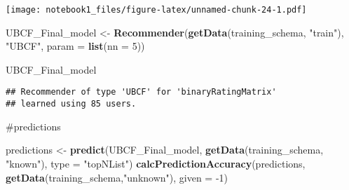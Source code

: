 \documentclass[
]{article}
\newenvironment{Shaded}{\begin{snugshade}}{\end{snugshade}}
\newcommand{\CommentTok}[1]{\textcolor[rgb]{0.56,0.35,0.01}{\textit{#1}}}
\newcommand{\DataTypeTok}[1]{\textcolor[rgb]{0.13,0.29,0.53}{#1}}
\newcommand{\DecValTok}[1]{\textcolor[rgb]{0.00,0.00,0.81}{#1}}
\newcommand{\KeywordTok}[1]{\textcolor[rgb]{0.13,0.29,0.53}{\textbf{#1}}}
\newcommand{\NormalTok}[1]{#1}
\newcommand{\OperatorTok}[1]{\textcolor[rgb]{0.81,0.36,0.00}{\textbf{#1}}}
\newcommand{\StringTok}[1]{\textcolor[rgb]{0.31,0.60,0.02}{#1}}
\begin{document}
\begin{Shaded}
\end{Shaded}

\texttt{[image: notebook1\_files/figure-latex/unnamed-chunk-24-1.pdf]}

\begin{Shaded}
\begin{Highlighting}[]
\NormalTok{UBCF_Final_model <-}\StringTok{ }\KeywordTok{Recommender}\NormalTok{(}\KeywordTok{getData}\NormalTok{(training_schema, }\StringTok{"train"}\NormalTok{), }\StringTok{"UBCF"}\NormalTok{, }\DataTypeTok{param =} \KeywordTok{list}\NormalTok{(}\DataTypeTok{nn =} \DecValTok{5}\NormalTok{))}


\NormalTok{UBCF_Final_model}
\end{Highlighting}
\end{Shaded}

\begin{verbatim}
## Recommender of type 'UBCF' for 'binaryRatingMatrix' 
## learned using 85 users.
\end{verbatim}

\#predictions

\begin{Shaded}
\begin{Highlighting}[]
\NormalTok{predictions <-}\StringTok{ }\KeywordTok{predict}\NormalTok{(UBCF_Final_model, }\KeywordTok{getData}\NormalTok{(training_schema, }\StringTok{"known"}\NormalTok{), }\DataTypeTok{type =} \StringTok{"topNList"}\NormalTok{)}
\KeywordTok{calcPredictionAccuracy}\NormalTok{(predictions, }\KeywordTok{getData}\NormalTok{(training_schema,}\StringTok{"unknown"}\NormalTok{), }\DataTypeTok{given =} \DecValTok{-1}\NormalTok{)}
\end{Highlighting}
\end{Shaded}
\end{document}

